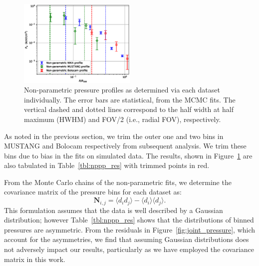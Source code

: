 \documentclass[onecolumn,traditabstract]{aa}
\begin{document}
\begin{figure}[!h]
  \centering
  \includegraphics[width=0.5\textwidth]{NIKA_ml_deproj_figs/Real_Joint_gNFW_Power_Real_11011111_2500S_500B_100W_non_parametric_pressure_p16cosmo.eps}
  \caption{Non-parametric pressure profiles as determined via each dataset individually. The error bars are statistical,
    from the MCMC fits. The vertical dashed and dotted lines correspond to the half width at half maximum (HWHM) and
    FOV/2 (i.e., radial FOV), respectively.}
  \label{fig:nppps}
\end{figure}

As noted in the previous section, we trim the outer one and two bins in MUSTANG and Bolocam respectively from subsequent analysis.
We trim these bins due to bias in the fits on simulated data. The results, shown in Figure~\ref{fig:nppps} are also tabulated
in Table~\ref{tbl:nppp_res} with trimmed points in red.



From the Monte Carlo chains of the non-parametric fits, we determine the covariance matrix of the pressure bins for each dataset as:
\begin{equation}
  \mathbf{N}_{i,j} = \langle d_i d_j \rangle - \langle d_i \rangle \langle d_j \rangle.
  \label{eqn:covariance}
\end{equation}
This formulation assumes that the data is well described by a Gaussian distribution; however Table~\ref{tbl:nppp_res}
  shows that the distributions of binned pressures are asymmetric. From the residuals in Figure~\ref{fig:joint_pressure},
  which account for the asymmetries, we find that assuming Gaussian distributions does not adversely impact our
  results, particularly as we have employed the covariance matrix in this work.
\end{document}
